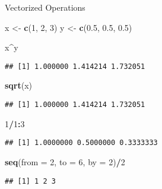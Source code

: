 \documentclass[ignorenonframetext,]{beamer}
\newenvironment{Shaded}{\begin{snugshade}}{\end{snugshade}}
\newcommand{\DataTypeTok}[1]{\textcolor[rgb]{0.13,0.29,0.53}{#1}}
\newcommand{\DecValTok}[1]{\textcolor[rgb]{0.00,0.00,0.81}{#1}}
\newcommand{\FloatTok}[1]{\textcolor[rgb]{0.00,0.00,0.81}{#1}}
\newcommand{\KeywordTok}[1]{\textcolor[rgb]{0.13,0.29,0.53}{\textbf{#1}}}
\newcommand{\NormalTok}[1]{#1}
\newcommand{\OperatorTok}[1]{\textcolor[rgb]{0.81,0.36,0.00}{\textbf{#1}}}
\newcommand{\StringTok}[1]{\textcolor[rgb]{0.31,0.60,0.02}{#1}}
\begin{document}
\begin{frame}[fragile]{Vectorized Operations}
\protect\hypertarget{vectorized-operations-3}{}

\begin{Shaded}
\begin{Highlighting}[]
\NormalTok{x <-}\StringTok{ }\KeywordTok{c}\NormalTok{(}\DecValTok{1}\NormalTok{, }\DecValTok{2}\NormalTok{, }\DecValTok{3}\NormalTok{)}
\NormalTok{y <-}\StringTok{ }\KeywordTok{c}\NormalTok{(}\FloatTok{0.5}\NormalTok{, }\FloatTok{0.5}\NormalTok{, }\FloatTok{0.5}\NormalTok{)}

\NormalTok{x}\OperatorTok{^}\NormalTok{y}
\end{Highlighting}
\end{Shaded}

\begin{verbatim}
## [1] 1.000000 1.414214 1.732051
\end{verbatim}

\begin{Shaded}
\begin{Highlighting}[]
\KeywordTok{sqrt}\NormalTok{(x)}
\end{Highlighting}
\end{Shaded}

\begin{verbatim}
## [1] 1.000000 1.414214 1.732051
\end{verbatim}

\begin{Shaded}
\begin{Highlighting}[]
\DecValTok{1}\OperatorTok{/}\DecValTok{1}\OperatorTok{:}\DecValTok{3}
\end{Highlighting}
\end{Shaded}

\begin{verbatim}
## [1] 1.0000000 0.5000000 0.3333333
\end{verbatim}

\begin{Shaded}
\begin{Highlighting}[]
\KeywordTok{seq}\NormalTok{(}\DataTypeTok{from =} \DecValTok{2}\NormalTok{, }\DataTypeTok{to =} \DecValTok{6}\NormalTok{, }\DataTypeTok{by =} \DecValTok{2}\NormalTok{)}\OperatorTok{/}\DecValTok{2}
\end{Highlighting}
\end{Shaded}

\begin{verbatim}
## [1] 1 2 3
\end{verbatim}

\end{frame}
\end{document}
